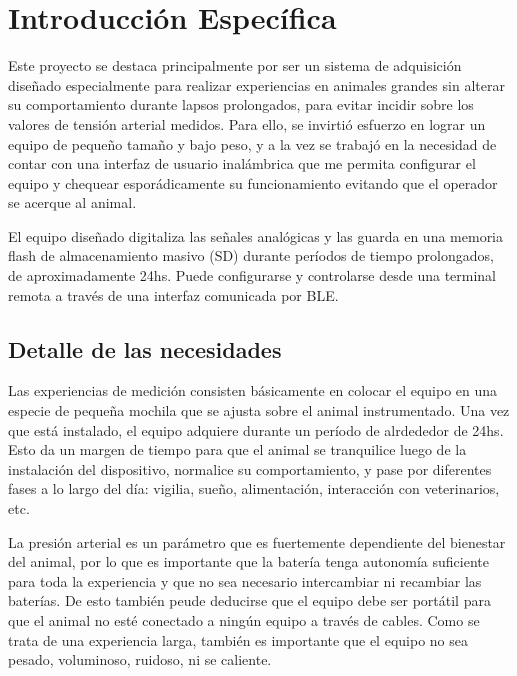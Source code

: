 \chapter{Introducción Específica} %

\label{Chapter2}

Este proyecto se destaca principalmente por ser un sistema de adquisición diseñado especialmente para realizar experiencias en animales grandes sin alterar su comportamiento durante lapsos prolongados, para evitar incidir sobre los valores de tensión arterial medidos. Para ello, se invirtió esfuerzo en lograr un equipo de pequeño tamaño y bajo peso, y a la vez se trabajó en la necesidad de contar con una interfaz de usuario inalámbrica que me permita configurar el equipo y chequear esporádicamente su funcionamiento evitando que el operador se acerque al animal. 

El equipo diseñado digitaliza las señales analógicas y las guarda en una memoria flash de almacenamiento masivo (SD) durante períodos de tiempo prolongados, de aproximadamente 24hs. Puede configurarse y controlarse desde una terminal remota a través de una interfaz comunicada por BLE.

\section{Detalle de las necesidades}

Las experiencias de medición consisten básicamente en colocar el equipo en una especie de pequeña mochila que se ajusta sobre el animal instrumentado. Una vez que está instalado, el equipo adquiere durante un período de alrdededor de 24hs. Esto da un margen de tiempo para que el animal se tranquilice luego de la instalación del dispositivo, normalice su comportamiento, y pase por diferentes fases a lo largo del día: vigilia, sueño, alimentación, interacción con veterinarios, etc. 

La presión arterial es un parámetro que es fuertemente dependiente del bienestar del animal, por lo que es importante que la batería tenga autonomía suficiente para toda la experiencia y que no sea necesario intercambiar ni recambiar las baterías. De esto también peude deducirse que el equipo debe ser portátil para que el animal no esté conectado a ningún equipo a través de cables. Como se trata de una experiencia larga, también es importante que el equipo no sea pesado, voluminoso, ruidoso, ni se caliente. 

